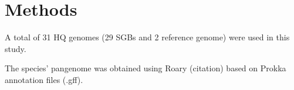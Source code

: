 \section*{Methods}



A total of 31 HQ genomes (29 SGBs and 2 reference genome) were used in this study. 

\nocite{*}



The species' pangenome was obtained using Roary (citation) based on Prokka annotation files (.gff). 









